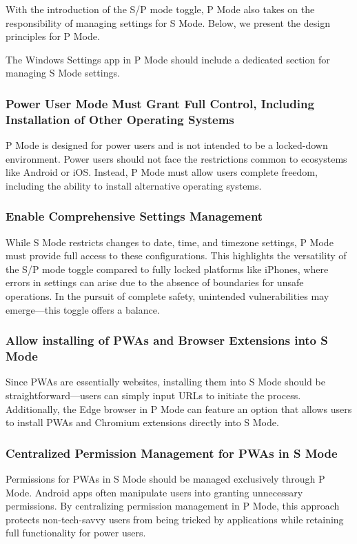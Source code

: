 With the introduction of the S/P mode toggle, P Mode also takes on the responsibility of managing settings for S Mode. Below, we present the design principles for P Mode.

The Windows Settings app in P Mode should include a dedicated section for managing S Mode settings.

\subsubsection{Power User Mode Must Grant Full Control, Including Installation of Other Operating Systems}

P Mode is designed for power users and is not intended to be a locked-down environment. Power users should not face the restrictions common to ecosystems like Android or iOS. Instead, P Mode must allow users complete freedom, including the ability to install alternative operating systems.

\subsubsection{Enable Comprehensive Settings Management}

While S Mode restricts changes to date, time, and timezone settings, P Mode must provide full access to these configurations. This highlights the versatility of the S/P mode toggle compared to fully locked platforms like iPhones, where errors in settings can arise due to the absence of boundaries for unsafe operations. In the pursuit of complete safety, unintended vulnerabilities may emerge—this toggle offers a balance.

\subsubsection{Allow installing of PWAs and Browser Extensions into S Mode}

Since PWAs are essentially websites, installing them into S Mode should be straightforward—users can simply input URLs to initiate the process. Additionally, the Edge browser in P Mode can feature an option that allows users to install PWAs and Chromium extensions directly into S Mode.

\subsubsection{Centralized Permission Management for PWAs in S Mode}

Permissions for PWAs in S Mode should be managed exclusively through P Mode. Android apps often manipulate users into granting unnecessary permissions. By centralizing permission management in P Mode, this approach protects non-tech-savvy users from being tricked by applications while retaining full functionality for power users.

